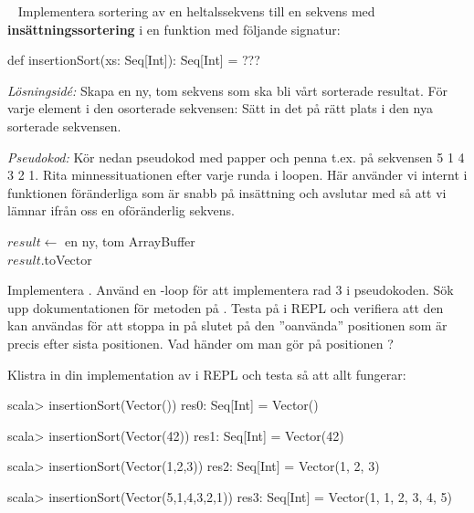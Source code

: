 \QUESTBEGIN

\Task  \what~ Implementera sortering av en heltalssekvens till en  sekvens med \textbf{insättningssortering}  i en funktion med följande signatur:
\begin{Code}
def insertionSort(xs: Seq[Int]): Seq[Int] = ???
\end{Code}

\emph{Lösningsidé:} Skapa en ny, tom sekvens som ska bli vårt sorterade resultat. För varje element i den osorterade sekvensen: Sätt in det på rätt plats i den nya sorterade sekvensen.

\Subtask \emph{Pseudokod:} Kör nedan pseudokod med papper och penna t.ex. på sekvensen 5 1 4 3 2 1. Rita minnessituationen efter varje runda i loopen. Här använder vi internt i funktionen föränderliga  som är snabb på insättning och avslutar med  så att vi lämnar ifrån oss en oföränderlig sekvens.

\begin{algorithm}[H]
    $result \leftarrow$ en ny, tom ArrayBuffer \\
    $result$.toVector
\end{algorithm}


\Subtask Implementera . Använd en -loop för att implementera rad 3 i pseudokoden. Sök upp dokumentationen för metoden  på . Testa   på  i REPL och verifiera att den kan användas för att stoppa in på slutet på den ''oanvända'' positionen som är precis efter sista positionen. Vad händer om man gör  på positionen ?

Klistra in din implementation av  i REPL och testa så att allt fungerar:
\begin{REPL}
scala> insertionSort(Vector())
res0: Seq[Int] = Vector()

scala> insertionSort(Vector(42))
res1: Seq[Int] = Vector(42)

scala> insertionSort(Vector(1,2,3))
res2: Seq[Int] = Vector(1, 2, 3)

scala> insertionSort(Vector(5,1,4,3,2,1))
res3: Seq[Int] = Vector(1, 1, 2, 3, 4, 5)
\end{REPL}


\SOLUTION

